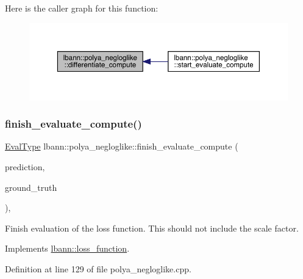 Here is the caller graph for this function\+:\nopagebreak
\begin{figure}[H]
\begin{center}
\leavevmode
\includegraphics[width=350pt]{classlbann_1_1polya__negloglike_a95fea60663d86cab31d89531046cc32c_icgraph}
\end{center}
\end{figure}
\mbox{\label{classlbann_1_1polya__negloglike_a81dbe71fef52ee0874549c4cf96c01e3}} 
\subsubsection{\texorpdfstring{finish\+\_\+evaluate\+\_\+compute()}{finish\_evaluate\_compute()}}
{\footnotesize\ttfamily \hyperlink{base_8hpp_a3266f5ac18504bbadea983c109566867}{Eval\+Type} lbann\+::polya\+\_\+negloglike\+::finish\+\_\+evaluate\+\_\+compute (\begin{DoxyParamCaption}\item[{const \hyperlink{base_8hpp_a9a697a504ae84010e7439ffec862b470}{Abs\+Dist\+Mat} \&}]{prediction,  }\item[{const \hyperlink{base_8hpp_a9a697a504ae84010e7439ffec862b470}{Abs\+Dist\+Mat} \&}]{ground\+\_\+truth }\end{DoxyParamCaption})\hspace{0.3cm}{\ttfamily [override]}, {\ttfamily [virtual]}}

Finish evaluation of the loss function. This should not include the scale factor. 

Implements \hyperlink{classlbann_1_1loss__function_a3ea8553a4e9c75477d7d4fc533c4d4fd}{lbann\+::loss\+\_\+function}.



Definition at line 129 of file polya\+\_\+negloglike.\+cpp.


